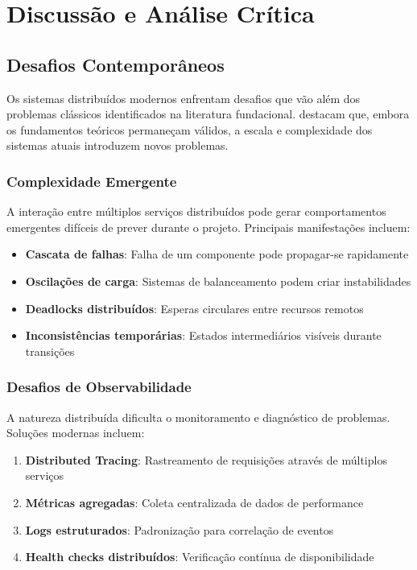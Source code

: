 \section{Discussão e Análise Crítica}

\subsection{Desafios Contemporâneos}

Os sistemas distribuídos modernos enfrentam desafios que vão além dos problemas clássicos identificados na literatura fundacional.  destacam que, embora os fundamentos teóricos permaneçam válidos, a escala e complexidade dos sistemas atuais introduzem novos problemas.

\subsubsection{Complexidade Emergente}

A interação entre múltiplos serviços distribuídos pode gerar comportamentos emergentes difíceis de prever durante o projeto. Principais manifestações incluem:

\begin{itemize}
    \item \textbf{Cascata de falhas}: Falha de um componente pode propagar-se rapidamente
    \item \textbf{Oscilações de carga}: Sistemas de balanceamento podem criar instabilidades
    \item \textbf{Deadlocks distribuídos}: Esperas circulares entre recursos remotos
    \item \textbf{Inconsistências temporárias}: Estados intermediários visíveis durante transições
\end{itemize}

\subsubsection{Desafios de Observabilidade}

A natureza distribuída dificulta o monitoramento e diagnóstico de problemas. Soluções modernas incluem:

\begin{enumerate}
    \item \textbf{Distributed Tracing}: Rastreamento de requisições através de múltiplos serviços
    \item \textbf{Métricas agregadas}: Coleta centralizada de dados de performance
    \item \textbf{Logs estruturados}: Padronização para correlação de eventos
    \item \textbf{Health checks distribuídos}: Verificação contínua de disponibilidade
\end{enumerate}

